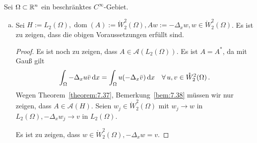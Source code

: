 \begin{bsp}
\label{bsp:9.10}
Sei $\Omega \subset \mathbb{R}^n$ ein beschränktes $C^\infty$-Gebiet.
\begin{enumerate}[(a)]
\item Sei $H:= L_2(\Omega), \operatorname{dom}(A) :=\mathring W^2_2 (\Omega), Aw := -\Delta_x w, w \in \mathring W^2_2 (\Omega)$. Es ist zu zeigen, dass die obigen Voraussetzungen erfüllt sind.
\begin{proof}
Es ist noch zu zeigen, dass $A \in \mathcal A(L_2(\Omega))$. Es ist $A=A^\ast$, da mit Gauß gilt
\[
	\int_\Omega -\Delta_x u \bar v \,\mathrm{d} x = \int_\Omega u(-\Delta_x \bar v )\,\mathrm{d} x \quad \forall \, u,v \in \mathring W^2_2(\Omega) \, .
\]
Wegen Theorem~\ref{theorem:7.37}, Bemerkung~\ref{bem:7.38} müssen wir nur zeigen, dass $A \in \mathcal A(H)$. Seien $w_j \in \mathring W^2_2(\Omega)$ mit $w_j \rightarrow w$ in $L_2 (\Omega), -\Delta_x w_j \rightarrow v$ in $L_2(\Omega)$.

Es ist zu zeigen, dass $w \in \mathring W^2_2(\Omega), -\Delta_x w = v$.


\end{proof}
\end{enumerate}
\end{bsp}
